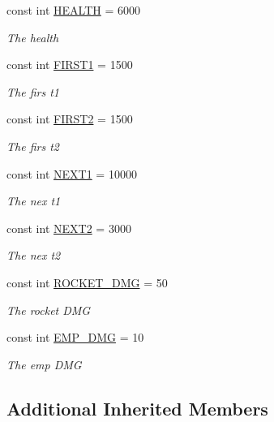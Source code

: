 \begin{DoxyCompactItemize}
\item 
const int \hyperlink{classXaria_1_1Enemies_1_1Boss2_a37de5d332ebbf703b2d86c52a92a755c}{H\+E\+A\+L\+TH} = 6000
\begin{DoxyCompactList}\small\item\em The health \end{DoxyCompactList}\item 
const int \hyperlink{classXaria_1_1Enemies_1_1Boss2_a06361534796ae930ef2006e58ea23920}{F\+I\+R\+S\+T1} = 1500
\begin{DoxyCompactList}\small\item\em The firs t1 \end{DoxyCompactList}\item 
const int \hyperlink{classXaria_1_1Enemies_1_1Boss2_a2dbe8d492eb2443937b43319d61e3885}{F\+I\+R\+S\+T2} = 1500
\begin{DoxyCompactList}\small\item\em The firs t2 \end{DoxyCompactList}\item 
const int \hyperlink{classXaria_1_1Enemies_1_1Boss2_aa782051d06964f728d7a15fbfd09c6bb}{N\+E\+X\+T1} = 10000
\begin{DoxyCompactList}\small\item\em The nex t1 \end{DoxyCompactList}\item 
const int \hyperlink{classXaria_1_1Enemies_1_1Boss2_afa8b6cd4e7a73d6edfd502f3c62b908e}{N\+E\+X\+T2} = 3000
\begin{DoxyCompactList}\small\item\em The nex t2 \end{DoxyCompactList}\item 
const int \hyperlink{classXaria_1_1Enemies_1_1Boss2_abce577f243ed09fbee7c75831dab839e}{R\+O\+C\+K\+E\+T\+\_\+\+D\+MG} = 50
\begin{DoxyCompactList}\small\item\em The rocket D\+MG \end{DoxyCompactList}\item 
const int \hyperlink{classXaria_1_1Enemies_1_1Boss2_a4456efd332e64bef10afd4ffd1c4ec25}{E\+M\+P\+\_\+\+D\+MG} = 10
\begin{DoxyCompactList}\small\item\em The emp D\+MG \end{DoxyCompactList}\end{DoxyCompactItemize}
\subsection*{Additional Inherited Members}


